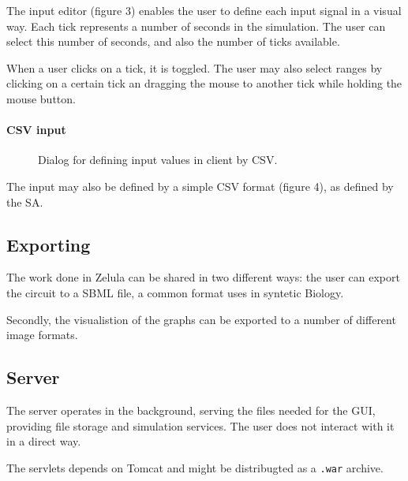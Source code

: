\noindent The input editor (figure 3) enables the user to define each input signal in a visual way. Each tick represents a number of seconds in the simulation. The user can select this number of seconds, and also the number of ticks available.

When a user clicks on a tick, it is toggled. The user may also select ranges by clicking on a certain tick an dragging the mouse to another tick while holding the mouse button.

\newpage
\paragraph{CSV input}
\begin{figure}[h!]
\centering{}
\caption{Dialog for defining input values in client by CSV.}
\end{figure}

\noindent The input may also be defined by a simple CSV format (figure 4), as defined by the SA.

\subsection{Exporting}
The work done in Zelula can be shared in two different ways: the user can export the circuit to a SBML file, a common format uses in syntetic Biology.

Secondly, the visualistion of the graphs can be exported to a number of different image formats.

\subsection{Server}
The server operates in the background, serving the files needed for the GUI, providing file storage and simulation services. The user does not interact with it in a direct way.

The servlets depends on Tomcat and might be distribugted as a \verb|.war| archive. 
